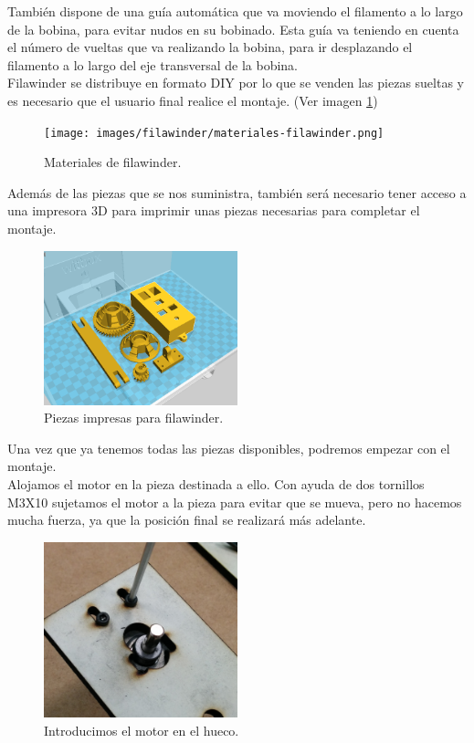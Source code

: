 También dispone de una guía automática que va moviendo el filamento a lo largo de la bobina, para evitar nudos en su bobinado. Esta guía va teniendo en cuenta el número de vueltas que va realizando la bobina, para ir desplazando el filamento a lo largo del eje transversal de la bobina.\\

Filawinder se distribuye en formato DIY por lo que se venden las piezas sueltas y es necesario que el usuario final realice el montaje. (Ver imagen \ref{fig:winder_material})
    \begin{figure}[H]
            \centering
            \texttt{[image: images/filawinder/materiales-filawinder.png]}
            \caption{Materiales de filawinder.}
            \label{fig:winder_material}
    \end{figure}

Además de las piezas que se nos suministra, también será necesario tener acceso a una impresora 3D para imprimir unas piezas necesarias para completar el montaje.

    \begin{figure}[H]
            \centering
            \includegraphics[width=0.5\textwidth]{images/filawinder/piezas-impresas.png}
            \caption{Piezas impresas para filawinder.}
            \label{fig:winder_piezas}
    \end{figure}

 Una vez que ya tenemos todas las piezas disponibles, podremos empezar con el montaje.\\

Alojamos el motor en la pieza destinada a ello. Con ayuda de dos tornillos M3X10 sujetamos el motor a la pieza para evitar que se mueva, pero no hacemos mucha fuerza, ya que la posición final se realizará más adelante.

    \begin{figure}[H]
            \centering
            \includegraphics[width=0.5\textwidth]{images/filawinder/montaje1.png}
            \caption{Introducimos el motor en el hueco.}
            \label{fig:winder_piezas}
    \end{figure}


